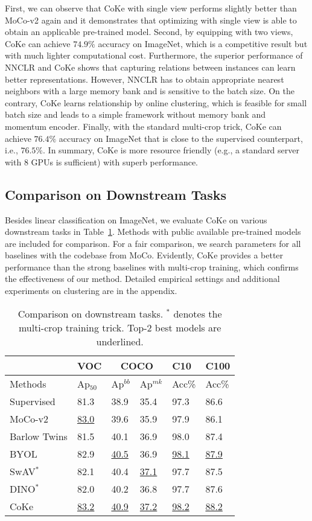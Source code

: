 \documentclass[10pt,twocolumn,letterpaper]{article}
\begin{document}
First, we can observe that CoKe with single view performs slightly better than MoCo-v2 again and it demonstrates that optimizing with single view is able to obtain an applicable pre-trained model. Second, by equipping with two views, CoKe can achieve $74.9\%$ accuracy on ImageNet, which is a competitive result but with much lighter computational cost. Furthermore, the superior performance of NNCLR and CoKe shows that capturing relations between instances can learn better representations. However, NNCLR has to obtain appropriate nearest neighbors with a large memory bank and is sensitive to the batch size. On the contrary, CoKe learns relationship by online clustering, which is feasible for small batch size and leads to a simple framework without memory bank and momentum encoder. Finally, with the standard multi-crop trick, CoKe can achieve $76.4\%$ accuracy on ImageNet that is close to the supervised counterpart, i.e., $76.5\%$. In summary, CoKe is more resource friendly (e.g., a standard server with $8$ GPUs is sufficient) with superb performance.

\subsection{Comparison on Downstream Tasks}
Besides linear classification on ImageNet, we evaluate CoKe on various downstream tasks in Table~\ref{ta:ds}. Methods with public available pre-trained models are included for comparison. For a fair comparison, we search parameters for all baselines with the codebase from MoCo. Evidently, CoKe provides a better performance than the strong baselines with multi-crop training, which confirms the effectiveness of our method. Detailed empirical settings and additional experiments on clustering are in the appendix.

\begin{table}[!ht]
\centering
\small
\begin{tabular}{|l|l|l|l|l|l|}\hline
&VOC&\multicolumn{2}{c|}{COCO}&C10&C100\\\hline
Methods&Ap$_{50}$&Ap$^{bb}$&Ap$^{mk}$&Acc\%&Acc\%\\\hline
Supervised&81.3&38.9&35.4 &97.3&86.6\\\hline
MoCo-v2&\underline{83.0}&39.6&35.9&97.9&86.1\\\hline
Barlow Twins&81.5&40.1&36.9&98.0&87.4 \\\hline
BYOL& 82.9&\underline{40.5}&36.9&\underline{98.1}&\underline{87.9}  \\\hline
SwAV$^*$&82.1&40.4&\underline{37.1}&97.7&87.5 \\\hline
DINO$^*$&82.0&40.2&36.8&97.7& 87.6\\\hline
CoKe&\underline{83.2}&\underline{40.9}&\underline{37.2}&\underline{98.2}&\underline{88.2}\\\hline
\end{tabular}
\caption{Comparison on downstream tasks. $^*$ denotes the multi-crop training trick. Top-2 best models are underlined.}\label{ta:ds}
\end{table}
\end{document}
